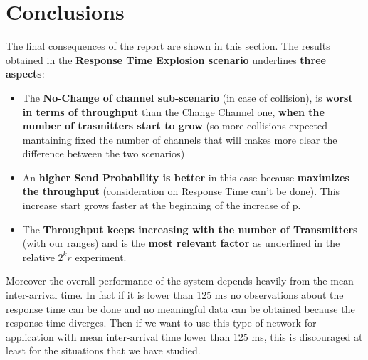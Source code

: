 \section{Conclusions}
The final consequences of the report are shown in this section. 
The results obtained in the \textbf{Response Time Explosion scenario} underlines \textbf{three aspects}:
\begin{itemize}
	\item The \textbf{No-Change of channel sub-scenario} (in case of collision), is \textbf{worst in terms of throughput} than the Change Channel one, \textbf{when the number of trasmitters start to grow} (so more collisions expected mantaining fixed the number of channels that will makes more clear the difference between the two scenarios)
	\item An \textbf{higher Send Probability is better} in this case because \textbf{maximizes the throughput} (consideration on Response Time can't be done). This increase start grows faster at the beginning of the increase of p. 
	\item The \textbf{Throughput keeps increasing with the number of Transmitters} (with our ranges) and is the \textbf{most relevant factor} as underlined in the relative $2^{k}r$ experiment.
\end{itemize} 

\noindent %

\noindent Moreover the overall performance of the system depends heavily from the mean inter-arrival time. In fact if it is lower than 125 ms no observations about the response time can be done and no meaningful data can be obtained because the response time diverges. Then if we want to use this type of network for application with mean inter-arrival time lower than 125 ms, this is discouraged at least for the situations that we have studied.

